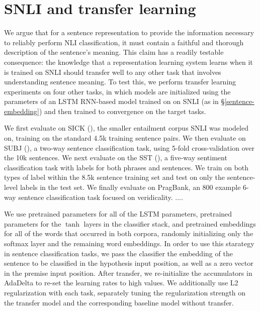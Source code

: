 \section{SNLI and transfer learning}\label{sec:transfer}

We argue that for a sentence representation to provide the information necessary to reliably perform NLI classification, it must contain a faithful and thorough description of the sentence's meaning. This claim has a readily testable consequence: the knowledge that a representation learning system learns when it is trained on SNLI should transfer well to any other task that involves understanding sentence meaning. To test this, we perform transfer learning experiments on four other tasks, in which models are initialized using the parameters of an LSTM RNN-based model trained on  on SNLI (as in \S\ref{sentence-embedding}) and then trained to convergence on the target tasks. 

We first evaluate on SICK (\citealt{marelli2014sick}), the smaller entailment corpus SNLI was modeled on, training on the standard 4.5k training sentence pairs. We then evaluate on SUBJ (\citealt{pang2004sentimental}), a two-way sentence classification task, using 5-fold cross-validation over the 10k sentences. We next evaluate on the SST (\citealt{socher2013acl1}), a five-way sentiment classification task with labels for both phrases and sentences. We train on both types of label within the 8.5k sentence training set and test on only the sentence-level labels in the test set. We finally evaluate on PragBank, an 800 example 6-way sentence classification task focused on veridicality.  ....

We use pretrained parameters for all of the LSTM parameters, pretrained parameters for the $\tanh$ layers in the classifier stack, and pretrained embeddings for all of the words that occurred in both corpora, randomly initializing only the softmax layer and the remaining word embeddings. In order to use this starategy in sentence classification tasks, we pass the classifier the embedding of the sentence to be classified in the hypothesis input position, as well as a zero vector in the premise input position. After transfer, we re-initialize the accumulators in AdaDelta to re-set the learning rates to high values. We additionally use L2 regularization with each task, separately tuning the regularization strength on the transfer model and the corresponding baseline model without transfer.


